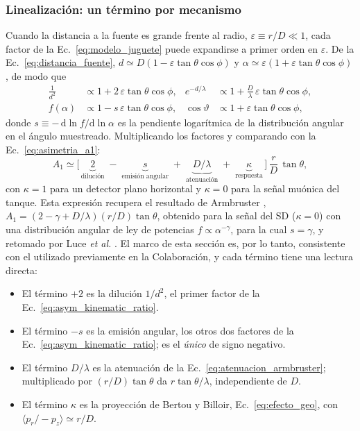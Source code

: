 \subsubsection{Linealización: un término por mecanismo}
\label{subsubsec:linealizacion}

Cuando la distancia a la fuente es grande frente al radio, $\varepsilon\equiv r/D \ll 1$, cada factor de la Ec.~\ref{eq:modelo_juguete} puede expandirse a primer orden en $\varepsilon$. De la Ec.~\ref{eq:distancia_fuente}, $d \simeq D(1-\varepsilon\tan\theta\cos\phi)$ y $\alpha\simeq\varepsilon(1+\varepsilon\tan\theta\cos\phi)$, de modo que
\begin{align}
	\frac{1}{d^2} &\propto 1 + 2\,\varepsilon\tan\theta\cos\phi, &
	e^{-d/\lambda} &\propto 1 + \frac{D}{\lambda}\,\varepsilon\tan\theta\cos\phi, \nonumber\\
	f(\alpha) &\propto 1 - s\,\varepsilon\tan\theta\cos\phi, &
	\cos\vartheta &\propto 1 + \varepsilon\tan\theta\cos\phi, \nonumber
\end{align}
donde $s \equiv -\,\mathrm{d}\ln f/\mathrm{d}\ln\alpha$ es la pendiente logarítmica de la distribución angular en el ángulo muestreado. Multiplicando los factores y comparando con la Ec.~\ref{eq:asimetria_a1}:
\begin{equation}
	A_1 \simeq \Big[\,\underbrace{2}_{\text{dilución}} \;-\; \underbrace{s}_{\text{emisión angular}} \;+\; \underbrace{D/\lambda}_{\text{atenuación}} \;+\; \underbrace{\kappa}_{\text{respuesta}}\,\Big]\,\frac{r}{D}\,\tan\theta ,
	\label{eq:a1_lineal}
\end{equation}
con $\kappa = 1$ para un detector plano horizontal y $\kappa = 0$ para la señal muónica del tanque. Esta expresión recupera el resultado de Armbruster \cite{Armbruster2018}, $A_1 = (2-\gamma+D/\lambda)(r/D)\tan\theta$, obtenido para la señal del SD ($\kappa=0$) con una distribución angular de ley de potencias $f\propto\alpha^{-\gamma}$, para la cual $s=\gamma$, y retomado por Luce \textit{et al.} \cite{Luce_ICRC2021}. El marco de esta sección es, por lo tanto, consistente con el utilizado previamente en la Colaboración, y cada término tiene una lectura directa:
\begin{itemize}
	\item El término $+2$ es la dilución $1/d^2$, el primer factor de la Ec.~\ref{eq:asym_kinematic_ratio}.
	\item El término $-s$ es la emisión angular, los otros dos factores de la Ec.~\ref{eq:asym_kinematic_ratio}; es el \textit{único} de signo negativo.
	\item El término $D/\lambda$ es la atenuación de la Ec.~\ref{eq:atenuacion_armbruster}; multiplicado por $(r/D)\tan\theta$ da $r\tan\theta/\lambda$, independiente de $D$.
	\item El término $\kappa$ es la proyección de Bertou y Billoir, Ec.~\ref{eq:efecto_geo}, con $\langle p_r/-p_z\rangle\simeq r/D$.
\end{itemize}
